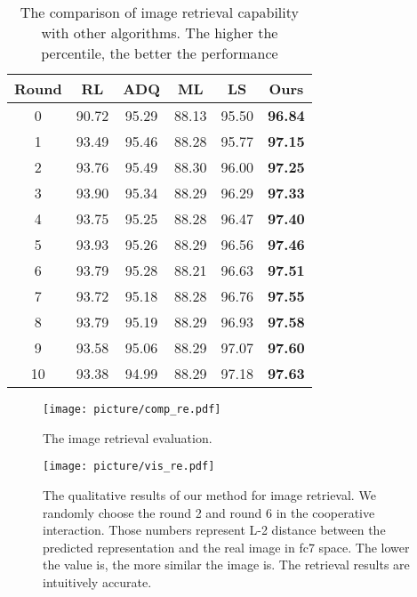\documentclass[review]{elsarticle}
\begin{document}
	\begin{table}[]
		\centering
		\label{my-label}
			\begin{tabular}{c|c|c|c|c|c}
				\hline
				Round & RL \cite{DBLP:conf/iccv/DasKMLB17}    & ADQ \cite{DBLP:conf/emnlp/MurahariCBPD19}    & ML \cite{DBLP:conf/atal/AgarwalGSLS19}    & LS \cite{DBLP:conf/iclr/LeeGYYH19} & Ours  \\ \hline
				0     & 90.72 & 95.29 & 88.13 & 95.50 & \textbf{96.84} \\
				1     & 93.49 & 95.46 & 88.28 & 95.77 & \textbf{97.15} \\
				2     & 93.76 & 95.49 & 88.30 & 96.00 & \textbf{97.25} \\
				3     & 93.90 & 95.34 & 88.29 & 96.29 & \textbf{97.33} \\
				4     & 93.75 & 95.25 & 88.28 & 96.47 & \textbf{97.40} \\
				5     & 93.93 & 95.26 & 88.29 & 96.56 & \textbf{97.46} \\
				6     & 93.79 & 95.28 & 88.21 & 96.63 & \textbf{97.51} \\
				7     & 93.72 & 95.18 & 88.28 & 96.76 & \textbf{97.55} \\
				8     & 93.79 & 95.19 & 88.29 & 96.93 & \textbf{97.58} \\
				9     & 93.58 & 95.06 & 88.29 & 97.07 & \textbf{97.60} \\
				10    & 93.38 & 94.99 & 88.29 & 97.18 & \textbf{97.63} \\ \hline
			\end{tabular}
		\caption{The comparison of image retrieval capability with other algorithms. The higher the percentile, the better the performance}
		\label{Tab2}
	\end{table}
	
	\begin{figure*}[ht]
		\centering
		\texttt{[image: picture/comp\_re.pdf]}
		\centering 
		
		\caption{The image retrieval evaluation.} 
		\label{fig.retrieval}
	\end{figure*}	
	
	\begin{figure*}[]
		\centering
		\centering
		\texttt{[image: picture/vis\_re.pdf]}
		\centering 
		\caption{The qualitative results of our method for image retrieval. We randomly choose the round 2 and round 6 in the cooperative interaction. Those numbers represent L-2 distance between the predicted representation and the real image in fc7 space. The lower the value is, the more similar the image is. The retrieval results are intuitively accurate.} 
		\label{fig.vis_re}
	\end{figure*}	
	
\end{document}
